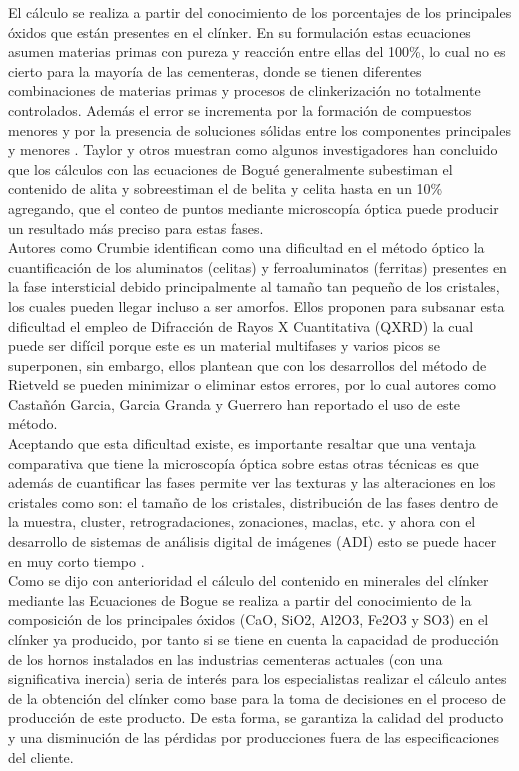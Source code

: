 \documentclass[spanish]{report}
\begin{document}
El cálculo se realiza a partir del conocimiento de los porcentajes de los principales óxidos que están presentes en el clínker.  En su formulación estas  ecuaciones asumen materias primas con pureza y reacción entre ellas del 100\%, lo cual no es cierto para la mayoría de las cementeras, donde se tienen diferentes combinaciones de materias primas y procesos de clinkerización no totalmente controlados. Además el error se incrementa por la formación de compuestos menores y por la presencia de soluciones sólidas entre los componentes principales y menores \cite{lawrence1998constitution}.
Taylor \cite{taylor1997cement} y otros muestran como algunos investigadores han concluido que los cálculos con las ecuaciones de Bogué generalmente subestiman el contenido de alita y sobreestiman el de belita y celita hasta en un 10\% agregando, que el conteo de puntos mediante microscopía óptica puede producir un resultado más preciso para estas fases.\\

Autores como Crumbie \cite{crumbie2006iron} identifican como una dificultad en el método óptico la cuantificación de los aluminatos (celitas) y ferroaluminatos (ferritas) presentes en la fase intersticial debido principalmente al tamaño tan pequeño de los cristales, los cuales pueden llegar incluso a ser amorfos. Ellos proponen para subsanar esta dificultad el empleo de Difracción de Rayos X Cuantitativa (QXRD) la cual puede ser difícil porque este es un material multifases y varios picos se superponen, sin embargo, ellos plantean que con los desarrollos del método de Rietveld se pueden minimizar o eliminar estos errores, por lo cual autores como Castañón Garcia, Garcia Granda y Guerrero \cite{castanon2012estudio} han reportado el uso de este método.\\

Aceptando que esta dificultad existe, es importante resaltar que una ventaja comparativa que tiene la microscopía óptica sobre estas otras técnicas es que además de cuantificar las fases permite ver las texturas y las alteraciones en los cristales como son: el tamaño de los cristales, distribución de las fases dentro de la muestra, cluster, retrogradaciones, zonaciones, maclas, etc. \cite{campbell1999microscopical} y ahora con el desarrollo de sistemas de análisis digital de imágenes (ADI) esto se puede hacer en muy corto tiempo \cite{garcia2003automatic}.\\

Como se dijo con anterioridad el cálculo del contenido en minerales del clínker mediante las Ecuaciones de Bogue se realiza a partir del conocimiento de la composición de los principales óxidos (CaO, SiO2, Al2O3, Fe2O3 y SO3) en el clínker ya producido, por tanto si se tiene en cuenta la capacidad de producción de los hornos instalados en las industrias cementeras actuales (con una significativa inercia) seria de interés para los especialistas realizar el cálculo antes de la obtención del clínker como base para la toma de decisiones en el proceso de producción de este producto. De esta forma, se garantiza la calidad del producto y una disminución de las pérdidas por producciones fuera de las especificaciones del cliente.\\
\end{document}

